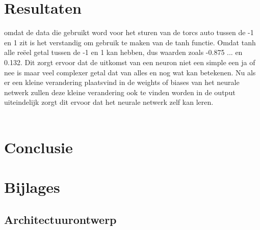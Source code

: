 \documentclass{article}
\begin{document}
\pagebreak

\pagebreak
\section{Resultaten}


omdat de data die gebruikt word voor het sturen van de torcs auto tussen de -1 en 1 zit is het verstandig om gebruik te maken van de tanh functie. Omdat tanh alle reëel getal tussen de -1 en 1 kan hebben, dus waarden zoals -0.875 ... en 0.132. Dit zorgt ervoor dat de uitkomst van een neuron niet een simple een ja of nee is maar veel complexer getal dat van alles en nog wat kan betekenen. Nu als er een kleine verandering plaatsvind in de weights of biases van het neurale netwerk zullen deze kleine verandering ook te vinden worden in de output uiteindelijk zorgt dit ervoor dat het neurale netwerk zelf kan leren.\\\\





\section{Conclusie}
\pagebreak
\section{Bijlages}
\subsection{Architectuurontwerp}

\pagebreak


\pagebreak
\end{document}
